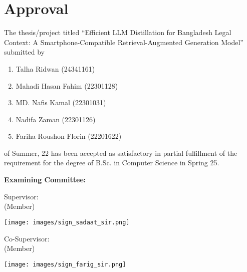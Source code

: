 \section*{Approval}

The thesis/project titled “Efficient LLM Distillation for Bangladesh Legal Context: A Smartphone-Compatible Retrieval-Augmented Generation Model” submitted by 
\begin{enumerate}
  \item Talha Ridwan (24341161)
  \item Mahadi Hasan Fahim (22301128)
  \item MD. Nafis Kamal (22301031) 
  \item Nadifa Zaman (22301126)
  \item Fariha Roushon Florin (22201622)
\end{enumerate}

of Summer, 22 has been accepted as satisfactory in partial fulfillment of the requirement for the degree of B.Sc. in Computer Science in Spring 25. 

\vspace{0.5cm}
\textbf{Examining Committee:}

\vspace{1cm}

Supervisor:\\
(Member)
\begin{center}
    \hspace{7cm}\texttt{[image: images/sign\_sadaat\_sir.png]} \\
    \hspace{7cm}  \hspace{1cm} 
\end{center}

Co-Supervisor:\\
(Member)
\begin{center}
    \hspace{7cm}\texttt{[image: images/sign\_farig\_sir.png]} \\
    \hspace{7cm}  \hspace{1cm} 
\end{center}

